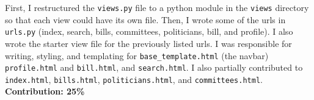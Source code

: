 \documentclass{article}
\newcommand{\n}{\noindent}
\begin{document}
First, I restructured the \verb|views.py| file to a python module in the \verb|views| directory so that each view could have its own file.  Then, I wrote some of the urls in \verb|urls.py| (index, search, bills, committees, politicians, bill, and profile).  I also wrote the starter view file for the previously listed urls.  I was responsible for writing, styling, and templating for \verb|base_template.html| (the navbar) \verb|profile.html| and \verb|bill.html|, and \verb|search.html|.  I also partially contributed to \verb|index.html|, \verb|bills.html|, \verb|politicians.html|, and \verb|committees.html|.\\

\n\textbf{Contribution: 25\%}
\end{document}
